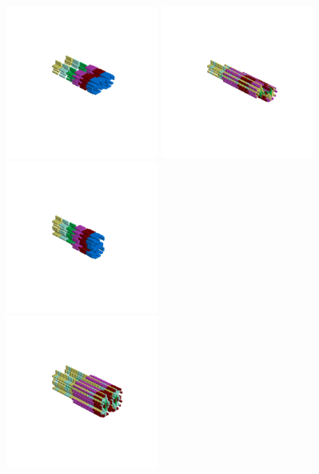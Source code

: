 \begin{minipage}[b]{0.48\linewidth}                                       
  \begin{figure}[H]
      \centering
        \vspace*{-1cm}
        \hspace*{-2cm}
        \includegraphics[width=5cm]{src/symmetries/pattern8_1-45.png}%
        \hspace*{-3cm}
        \includegraphics[width=5cm]{src/symmetries/pattern8_2-45.png}\\
        \vspace*{-3cm}
        \hspace*{-4cm}
        \includegraphics[width=5cm]{src/symmetries/pattern8_3-45.png} \\
        \vspace*{-5cm}
        \includegraphics[width=5cm]{src/symmetries/pattern8_4-45.png}
        \vspace*{-1cm}
  \caption*{}
  \end{figure}
\end{minipage}
